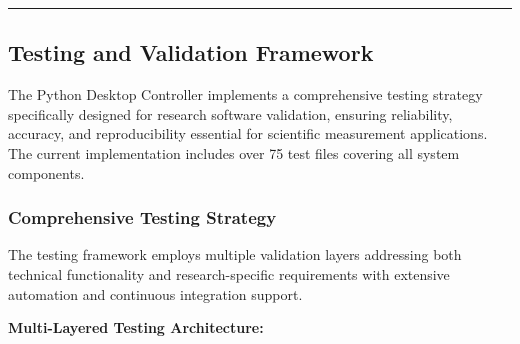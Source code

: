 \documentclass[11pt,a4paper]{article}
\begin{document}
\hrule

\subsection{Testing and Validation Framework}

The Python Desktop Controller implements a comprehensive testing strategy specifically designed for research software
validation, ensuring reliability, accuracy, and reproducibility essential for scientific measurement applications. The
current implementation includes over 75 test files covering all system components.

\subsubsection{Comprehensive Testing Strategy}

The testing framework employs multiple validation layers addressing both technical functionality and research-specific
requirements with extensive automation and continuous integration support.

\textbf{Multi-Layered Testing Architecture:}
\end{document}
